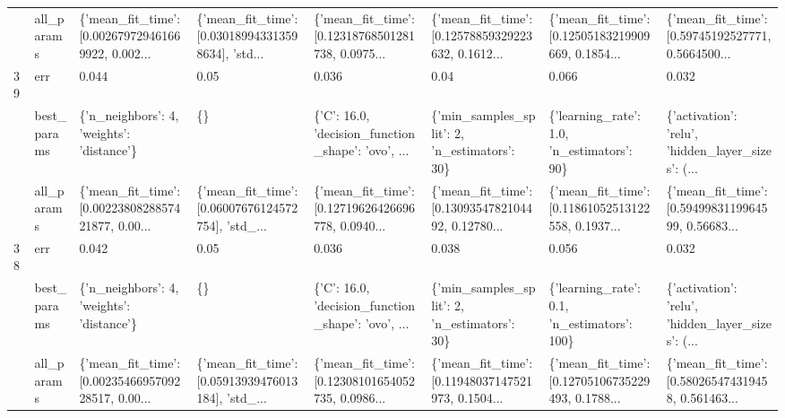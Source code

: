 \begin{tabular}{llllllll}
   & all\_params &  \{'mean\_fit\_time': [0.002679729461669922, 0.002... &  \{'mean\_fit\_time': [0.030189943313598634], 'std... &  \{'mean\_fit\_time': [0.12318768501281738, 0.0975... &  \{'mean\_fit\_time': [0.12578859329223632, 0.1612... &  \{'mean\_fit\_time': [0.12505183219909669, 0.1854... &  \{'mean\_fit\_time': [0.59745192527771, 0.5664500... \\
39 & err &                                              0.044 &                                               0.05 &                                              0.036 &                                               0.04 &                                              0.066 &                                              0.032 \\
   & best\_params &          \{'n\_neighbors': 4, 'weights': 'distance'\} &                                                 \{\} &  \{'C': 16.0, 'decision\_function\_shape': 'ovo', ... &       \{'min\_samples\_split': 2, 'n\_estimators': 30\} &         \{'learning\_rate': 1.0, 'n\_estimators': 90\} &  \{'activation': 'relu', 'hidden\_layer\_sizes': (... \\
   & all\_params &  \{'mean\_fit\_time': [0.0022380828857421877, 0.00... &  \{'mean\_fit\_time': [0.06007676124572754], 'std\_... &  \{'mean\_fit\_time': [0.12719626426696778, 0.0940... &  \{'mean\_fit\_time': [0.1309354782104492, 0.12780... &  \{'mean\_fit\_time': [0.11861052513122558, 0.1937... &  \{'mean\_fit\_time': [0.5949983119964599, 0.56683... \\
38 & err &                                              0.042 &                                               0.05 &                                              0.036 &                                              0.038 &                                              0.056 &                                              0.032 \\
   & best\_params &          \{'n\_neighbors': 4, 'weights': 'distance'\} &                                                 \{\} &  \{'C': 16.0, 'decision\_function\_shape': 'ovo', ... &       \{'min\_samples\_split': 2, 'n\_estimators': 30\} &        \{'learning\_rate': 0.1, 'n\_estimators': 100\} &  \{'activation': 'relu', 'hidden\_layer\_sizes': (... \\
   & all\_params &  \{'mean\_fit\_time': [0.0023546695709228517, 0.00... &  \{'mean\_fit\_time': [0.05913939476013184], 'std\_... &  \{'mean\_fit\_time': [0.12308101654052735, 0.0986... &  \{'mean\_fit\_time': [0.11948037147521973, 0.1504... &  \{'mean\_fit\_time': [0.12705106735229493, 0.1788... &  \{'mean\_fit\_time': [0.580265474319458, 0.561463... \\

\end{tabular}
